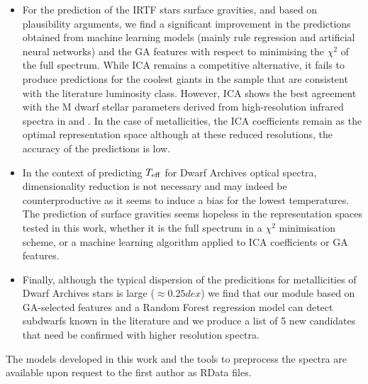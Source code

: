\begin{itemize}
\item For the prediction of the IRTF stars surface gravities, and
  based on plausibility arguments, we find a significant improvement
  in the predictions obtained from machine learning models (mainly
  rule regression and artificial neural networks) and the GA features
  with respect to minimising the $\chi^2$ of the full spectrum. While
  ICA remains a competitive alternative, it fails to produce
  predictions for the coolest giants in the sample that are consistent
  with the literature luminosity class. However, ICA shows the best
  agreement with the M dwarf stellar parameters derived from
  high-resolution infrared spectra in \cite{esm1} and \cite{esm2}. In
  the case of metallicities, the ICA coefficients remain as the
  optimal representation space although at these reduced resolutions,
  the accuracy of the predictions is low.

\item In the context of predicting $T_{\rm eff}$ for Dwarf Archives
  optical spectra, dimensionality reduction is not necessary and may
  indeed be counterproductive as it seems to induce a bias for the
  lowest temperatures.  The prediction of surface gravities seems
  hopeless in the representation spaces tested in this work, whether
  it is the full spectrum in a $\chi^2$ minimisation scheme, or a
  machine learning algorithm applied to ICA coefficients or GA
  features.

\item Finally, although the typical dispersion of the predicitions for
  metallicities of Dwarf Archives stars is large ($\approx 0.25 dex$)
  we find that our module based on GA-selected features and a Random
  Forest regression model can detect subdwarfs known in the literature
  and we produce a list of 5 new candidates that need be confirmed
  with higher resolution spectra.

\end{itemize}


The models developed in this work and the tools to preprocess the
spectra are available upon request to the first author as RData
files.
